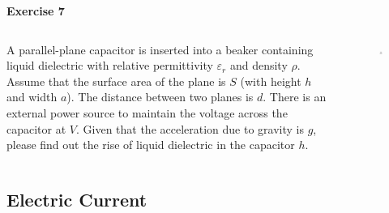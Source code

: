 \documentclass{beamer}
\begin{document}
\begin{frame}{\bf Exercise 7}
\begin{columns}
    \begin{column}{.7\linewidth}
        A parallel-plane capacitor is inserted into a beaker containing liquid dielectric with relative permittivity $\varepsilon_{r}$ and density $\rho$. 
        Assume that the surface area of the plane is $S$ (with height $h$ and width $a$). The distance between two planes is $d$. There is an external power 
        source to maintain the voltage across the capacitor at $V$. Given that the acceleration due to gravity is $g$, please find out the rise of liquid dielectric in the capacitor $h$.
    \end{column}
    \begin{column}{.3\linewidth}
        \begin{figure}
            \centering
            \includegraphics[scale=0.6]{images/014.png}
        \end{figure}
    \end{column}
\end{columns}
\end{frame}


\subsection{\bf Electric Current}
\end{document}
